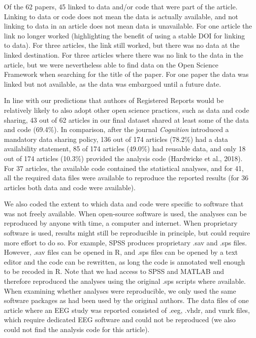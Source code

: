 \documentclass[
  ,jou, a4paper,floatsintext]{apa6}
\begin{document}
Of the 62 papers, 45 linked to data and/or code that were part of the article. Linking to data or code does not mean the data is actually available, and not linking to data in an article does not mean data is unavailable. For one article the link no longer worked (highlighting the benefit of using a stable DOI for linking to data). For three articles, the link still worked, but there was no data at the linked destination. For three articles where there was no link to the data in the article, but we were nevertheless able to find data on the Open Science Framework when searching for the title of the paper. For one paper the data was linked but not available, as the data was embargoed until a future date.

In line with our predictions that authors of Registered Reports would be relatively likely to also adopt other open science practices, such as data and code sharing, 43 out of 62 articles in our final dataset shared at least some of the data and code (69.4\%). In comparison, after the journal \emph{Cognition} introduced a mandatory data sharing policy, 136 out of 174 articles (78.2\%) had a data availability statement, 85 of 174 articles (49.0\%) had reusable data, and only 18 out of 174 articles (10.3\%) provided the analysis code (Hardwicke et al., 2018). For 37 articles, the available code contained the statistical analyses, and for 41, all the required data files were available to reproduce the reported results (for 36 articles both data and code were available).

We also coded the extent to which data and code were specific to software that was not freely available. When open-source software is used, the analyses can be reproduced by anyone with time, a computer and internet. When proprietary software is used, results might still be reproducible in principle, but could require more effort to do so. For example, SPSS produces proprietary .sav and .sps files. However, .sav files can be opened in R, and .sps files can be opened by a text editor and the code can be rewritten, as long the code is annotated well enough to be recoded in R. Note that we had access to SPSS and MATLAB and therefore reproduced the analyses using the original .sps scripts where available. When examining whether analyses were reproducible, we only used the same software packages as had been used by the original authors. The data files of one article where an EEG study was reported consisted of .eeg, .vhdr, and vmrk files, which require dedicated EEG software and could not be reproduced (we also could not find the analysis code for this article).
\end{document}
